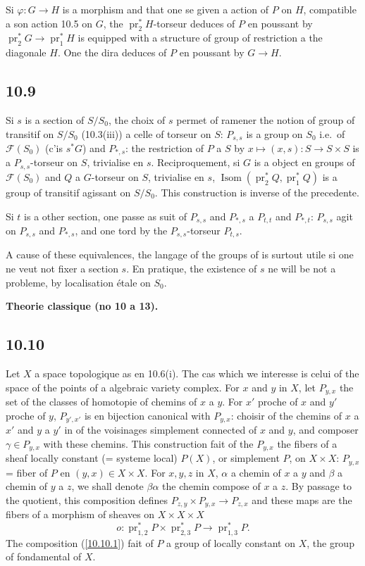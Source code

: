 \documentclass[12pt,a4paper]{article}
\theoremstyle{plain}
\theoremstyle{definition}
\theoremstyle{remark}
\DeclareMathOperator{\Isom}{Isom}
\DeclareMathOperator{\pr}{pr}
\begin{document}
Si $\varphi: G \to H$ is a morphism and that one se given a action of $P$ on $H$, compatible a son action 10.5 on $G$, the $\pr_2^* H$-torseur deduces of $P$ en poussant by $\pr_2^* G \to \pr_1^* H$ is equipped with a structure of group of restriction a the diagonale $H$. One the dira deduces of $P$ en poussant by $G \to H$.

\subsection*{10.9}

Si $s$ is a section of $S/S_0$, the choix of $s$ permet of ramener the notion of group of transitif on $S/S_0$ (10.3(iii)) a celle of torseur on $S$: $P_{s,s}$ is a group on $S_0$ i.e.~of $\mathcal{F}(S_0)$ (c'is $s^* G$) and $P_{*,s}$: the restriction of $P$ a $S$ by $x \mapsto (x,s): S \to S \times S$ is a $P_{s,s}$-torseur on $S$, trivialise en $s$. Reciproquement, si $G$ is a object en groups of $\mathcal{F}(S_0)$ and $Q$ a $G$-torseur on $S$, trivialise en $s$, $\Isom(\pr_2^* Q, \pr_1^* Q)$ is a group of transitif agissant on $S/S_0$. This construction is inverse of the precedente.

Si $t$ is a other section, one passe as suit of $P_{s,s}$ and $P_{*,s}$ a $P_{t,t}$ and $P_{*,t}$: $P_{s,s}$ agit on $P_{s,s}$ and $P_{*,s}$, and one tord by the $P_{s,s}$-torseur $P_{t,s}$.

A cause of these equivalences, the langage of the groups of is surtout utile si one ne veut not fixer a section $s$. En pratique, the existence of $s$ ne will be not a probleme, by localisation étale on $S_0$.


\textbf{Theorie classique (no 10 a 13).}

\subsection*{10.10}

Let $X$ a space topologique as en 10.6(i). The cas which we interesse is celui of the space of the points of a algebraic variety complex. For $x$ and $y$ in $X$, let $P_{y,x}$ the set of the classes of homotopie of chemins of $x$ a $y$. For $x'$ proche of $x$ and $y'$ proche of $y$, $P_{y',x'}$ is en bijection canonical with $P_{y,x}$: choisir of the chemins of $x$ a $x'$ and $y$ a $y'$ in of the voisinages simplement connected of $x$ and $y$, and composer $\gamma \in P_{y,x}$ with these chemins. This construction fait of the $P_{y,x}$ the fibers of a sheaf locally constant (= systeme local) $P(X)$, or simplement $P$, on $X \times X$: $P_{y,x}$ = fiber of $P$ en $(y,x) \in X \times X$. For $x, y, z$ in $X$, $\alpha$ a chemin of $x$ a $y$ and $\beta$ a chemin of $y$ a $z$, we shall denote $\beta\alpha$ the chemin compose of $x$ a $z$. By passage to the quotient, this composition defines $P_{z,y} \times P_{y,x} \to P_{z,x}$ and these maps are the fibers of a morphism of sheaves on $X \times X \times X$
\begin{equation}\label{10.10.1}
o: \pr_{1,2}^* P \times \pr_{2,3}^* P \longrightarrow \pr_{1,3}^* P. \tag{10.10.1}
\end{equation}
The composition (\ref{10.10.1}) fait of $P$ a group of locally constant on $X$, the group of fondamental of $X$.
\end{document}
